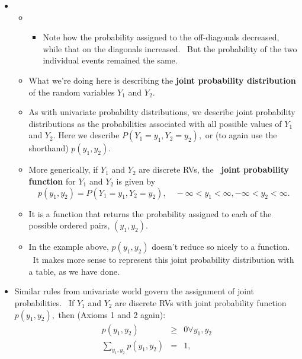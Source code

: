 \documentclass[11pt]{article}
\begin{document}
\begin{itemize}
\item 
\begin{itemize}
\item 
\begin{itemize}
\item Note how the probability assigned to the off-diagonals decreased,
while that on the diagonals increased. \ But the probability of the two
individual events remained the same. \ 
\end{itemize}

\item What we're doing here is describing the \textbf{joint probability
distribution }of the random variables $Y_{1}$ and $Y_{2}.$ \ 

\item As with univariate probability distributions, we describe joint
probability distributions as the probabilities associated with all possible
values of $Y_{1}$ and $Y_{2}.$ Here we describe $P(Y_{1}=y_{1},Y_{2}=y_{2}),$
or (to again use the shorthand) $p(y_{1},y_{2}).$

\item More generically, if $Y_{1}$ and $Y_{2}$ are discrete RVs, the\textbf{%
\ joint probability function} for $Y_{1}$ and $Y_{2}$ is given by%
\begin{equation*}
p(y_{1},y_{2})=P(Y_{1}=y_{1},Y_{2}=y_{2}),\quad -\infty <y_{1}<\infty
,-\infty <y_{2}<\infty .
\end{equation*}

\item It is a function that returns the probability assigned to each of the
possible ordered pairs, $(y_{1},y_{2})$.

\item In the example above, $p(y_{1},y_{2})$ doesn't reduce so nicely to a
function. \ It makes more sense to represent this joint probability
distribution with a table, as we have done.
\end{itemize}

\item Similar rules from univariate world govern the assignment of joint
probabilities. \ If $Y_{1}$ and $Y_{2}$ are discrete RVs with joint
probability function $p(y_{1},y_{2}),$ then (Axioms 1 and 2 again):%
\begin{eqnarray*}
p(y_{1},y_{2}) &\geq &0\forall y_{1},y_{2} \\
\sum_{y_{1},y_{2}}p(y_{1},y_{2}) &=&1,
\end{eqnarray*}


\end{itemize}
\end{document}

